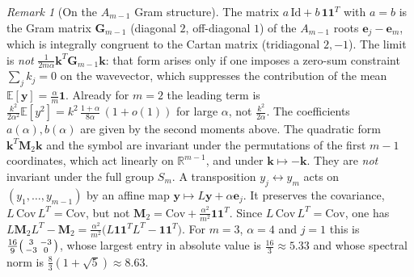 \documentclass[11pt,a4paper]{article}
\theoremstyle{plain}
\theoremstyle{definition}
\theoremstyle{remark}
\newtheorem{remark}[theorem]{Remark}
\numberwithin{equation}{section}
\providecommand{\Id}{\mathrm{Id}}
\begin{document}
\begin{remark}[On the $A_{m-1}$ Gram structure]
The matrix $a\,\Id + b\,\mathbf{1}\mathbf{1}^T$ with $a = b$ is the Gram matrix $\mathbf{G}_{m-1}$ (diagonal $2$, off-diagonal $1$) of the $A_{m-1}$ roots $\mathbf{e}_j - \mathbf{e}_m$, which is integrally congruent to the Cartan matrix (tridiagonal $2,-1$). The limit is \emph{not} $\frac{1}{2m\alpha}\mathbf{k}^T\mathbf{G}_{m-1}\mathbf{k}$: that form arises only if one imposes a zero-sum constraint $\sum_j k_j = 0$ on the wavevector, which suppresses the contribution of the mean $\mathbb{E}[\mathbf{y}] = \frac{\alpha}{m}\mathbf{1}$. Already for $m = 2$ the leading term is $\frac{k^2}{2\alpha^2}\mathbb{E}[y^2] = k^2\,\frac{1+\alpha}{8\alpha}\,(1 + o(1))$ for large $\alpha$, not $\frac{k^2}{2\alpha}$. The coefficients $a(\alpha), b(\alpha)$ are given by the second moments above. The quadratic form $\mathbf{k}^T\mathbf{M}_2\mathbf{k}$ and the symbol are invariant under the permutations of the first $m-1$ coordinates, which act linearly on $\mathbb{R}^{m-1}$, and under $\mathbf{k} \mapsto -\mathbf{k}$. They are \emph{not} invariant under the full group $S_m$. A transposition $y_j \leftrightarrow y_m$ acts on $(y_1, \dots, y_{m-1})$ by an affine map $\mathbf{y} \mapsto L\mathbf{y} + \alpha\mathbf{e}_j$. It preserves the covariance, $L\,\mathrm{Cov}\,L^T = \mathrm{Cov}$, but not $\mathbf{M}_2 = \mathrm{Cov} + \frac{\alpha^2}{m^2}\mathbf{1}\mathbf{1}^T$. Since $L\,\mathrm{Cov}\,L^T = \mathrm{Cov}$, one has $L\mathbf{M}_2L^T - \mathbf{M}_2 = \frac{\alpha^2}{m^2}\big(L\mathbf{1}\mathbf{1}^TL^T - \mathbf{1}\mathbf{1}^T\big)$. For $m = 3$, $\alpha = 4$ and $j = 1$ this is $\frac{16}{9}\begin{psmallmatrix} 3 & -3 \\ -3 & 0 \end{psmallmatrix}$, whose largest entry in absolute value is $\frac{16}{3} \approx 5.33$ and whose spectral norm is $\frac{8}{3}(1+\sqrt5) \approx 8.63$.
\end{remark}
\end{document}
